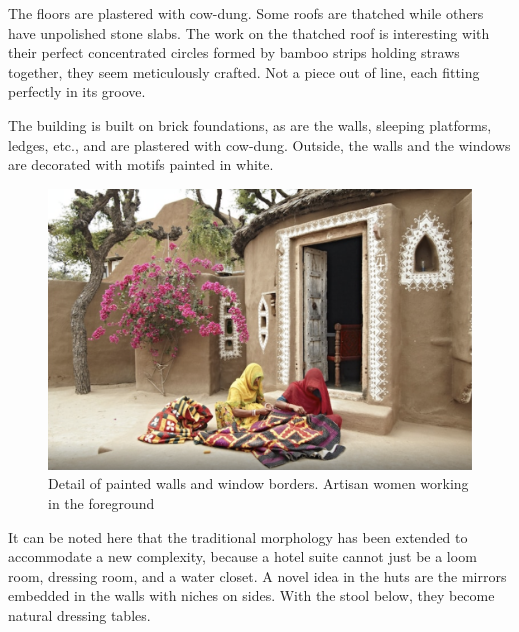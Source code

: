 
The floors are plastered with cow-dung. Some roofs are thatched while others have unpolished stone slabs. The work on the thatched roof is interesting with their perfect concentrated circles formed by bamboo strips holding straws together, they seem meticulously crafted. Not a piece out of line, each fitting perfectly in its groove.

The building is built on brick foundations, as are the walls, sleeping platforms, ledges, etc., and are plastered with cow-dung. Outside, the walls and the windows are decorated with motifs painted in white.

\begin{figure}[H]
  \centering
  \includegraphics[angle=0,width=1.0\textwidth]{img/dc-05}
  \caption{Detail of painted walls and window borders. Artisan women working in the foreground}
  \label{fig:dc-05} 
\end{figure}

\noindent It can be noted here that the traditional morphology has been extended to accommodate a new complexity, because a hotel suite cannot just be a loom room, dressing room, and a water closet. A novel idea in the huts are the mirrors embedded in the walls with niches on sides. With the stool below, they become natural dressing tables.

